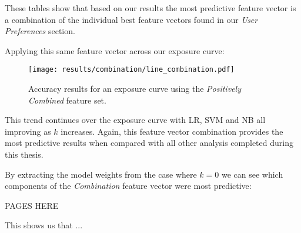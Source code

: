 These tables show that based on our results the most predictive feature vector is a combination of the individual best 
feature vectors found in our \emph{User Preferences} section.

\clearpage

Applying this same feature vector across our exposure curve:

\begin{figure}[h]
	\begin{center}
		\texttt{[image: results/combination/line\_combination.pdf]}
		\caption{Accuracy results for an exposure curve using the \emph{Positively Combined} feature set.}
	\end{center}
\end{figure}

This trend continues over the exposure curve with LR, SVM and NB all improving as $k$ increases. Again, this feature vector 
combination provides the most predictive results when compared with all other analysis completed during this thesis.

By extracting the model weights from the case where $k=0$ we can see which components of the \emph{Combination} feature vector were most
predictive:

PAGES HERE

This shows us that ...

